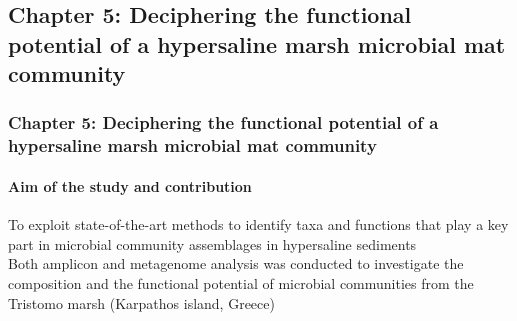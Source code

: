 \documentclass{beamer}
\begin{document}


         


 



   \begin{darkframes}
      \section{
         \textbf{Chapter 5:} Deciphering the functional potential of a hypersaline marsh microbial mat community
      }

      \begin{frame}
         \frametitle{\textbf{Chapter 5:} Deciphering the functional potential of a hypersaline marsh microbial mat community}
         \framesubtitle{Aim of the study and contribution}

         To exploit state-of-the-art methods to identify taxa and functions that play a key
         part in microbial community assemblages in hypersaline sediments \\ \bigskip 
         Both amplicon and metagenome analysis was conducted to investigate the composition and the functional 
         potential of microbial communities from the Tristomo marsh (Karpathos island, Greece)
      \end{frame}

   \end{darkframes}
\end{document}

